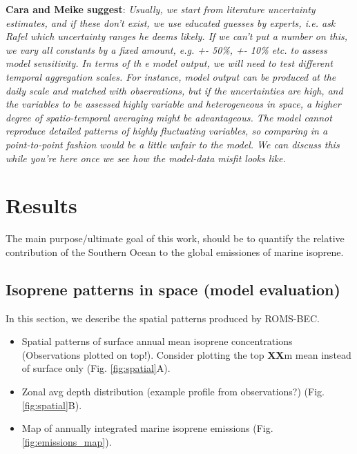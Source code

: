 \documentclass[draft,linenumbers]{agujournal}
\begin{document}
\textbf{Cara and Meike suggest}: \textit{Usually, we start from literature uncertainty estimates, and if these don't exist, we use educated guesses by experts, i.e. ask Rafel which uncertainty ranges he deems likely. If we can't put a number on this, we vary all constants by a fixed amount, e.g. +- 50\%, +- 10\% etc. to assess model sensitivity. In terms of th e model output, we will need to test different temporal aggregation scales. For instance, model output can be produced at the daily scale and matched with observations, but if the uncertainties are high, and the variables to be assessed highly variable and heterogeneous in space, a higher degree of spatio-temporal averaging might be advantageous. The model cannot reproduce detailed patterns of highly fluctuating variables, so comparing in a point-to-point fashion would be a little unfair to the model. We can discuss this while you're here once we see how the model-data misfit looks like.}\\

\section{Results}

The main purpose/ultimate goal of this work, should be to quantify the {relative contribution of the Southern Ocean to the global emissiones of marine isoprene}. 

\subsection{Isoprene patterns in space (model evaluation)}
In this section, we describe the spatial patterns produced by ROMS-BEC.

\begin{itemize}
\item Spatial patterns of surface annual mean isoprene concentrations (Observations plotted on top!). Consider plotting the top \textbf{XX}m mean instead of surface only (Fig. \ref{fig:spatial}A). 
\item Zonal avg depth distribution (example profile from observations?) (Fig. \ref{fig:spatial}B). 
\item Map of annually integrated marine isoprene emissions (Fig. \ref{fig:emissions_map}).
\end{itemize}
\end{document}
